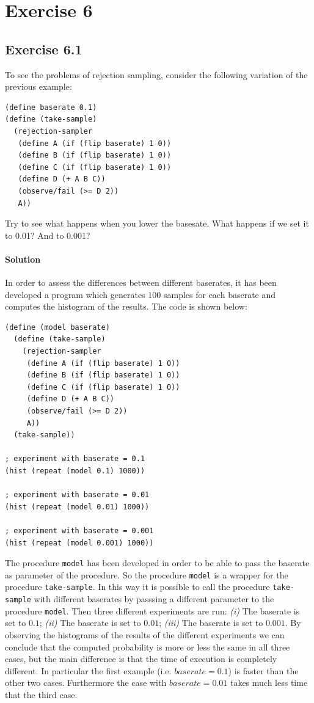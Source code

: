 \section*{Exercise 6}

\subsection*{Exercise 6.1}
To see the problems of rejection sampling, consider the following variation of the previous example:

\begin{lstlisting}
(define baserate 0.1)
(define (take-sample)
  (rejection-sampler
   (define A (if (flip baserate) 1 0))
   (define B (if (flip baserate) 1 0))
   (define C (if (flip baserate) 1 0))
   (define D (+ A B C))
   (observe/fail (>= D 2))
   A))
\end{lstlisting}

Try to see what happens when you lower the basesate. What happens if we set it to 0.01? And to 0.001?

\paragraph{Solution}
In order to assess the differences between different baserates, it has been developed a program which generates $100$ samples for each
baserate and computes the histogram of the results. The code is shown below:
\begin{lstlisting}
(define (model baserate)
  (define (take-sample)
    (rejection-sampler
     (define A (if (flip baserate) 1 0))
     (define B (if (flip baserate) 1 0))
     (define C (if (flip baserate) 1 0))
     (define D (+ A B C))
     (observe/fail (>= D 2))
     A))
  (take-sample))

; experiment with baserate = 0.1
(hist (repeat (model 0.1) 1000))

; experiment with baserate = 0.01
(hist (repeat (model 0.01) 1000))

; experiment with baserate = 0.001
(hist (repeat (model 0.001) 1000))
\end{lstlisting}

The procedure \texttt{model} has been developed in order to be able to pass the baserate as parameter of the procedure. So the 
procedure \texttt{model} is a wrapper for the procedure \texttt{take-sample}. In this way it is possible to call the procedure 
\texttt{take-sample} with different baserates by passsing a different parameter to the procedure \texttt{model}.
Then three different experiments are run: \textit{(i)} The baserate is set to $0.1$; \textit{(ii)} The baserate is set to $0.01$;
\textit{(iii)} The baserate is set to $0.001$.
By observing the histograms of the results of the different experiments we can conclude that the computed probability is more or less
the same in all three cases, but the main difference is that the time of execution is completely different.
In particular the first example (i.e. $baserate = 0.1$) is faster than the other two cases. 
Furthermore the case with $baserate = 0.01$ takes much less time that the third case.

